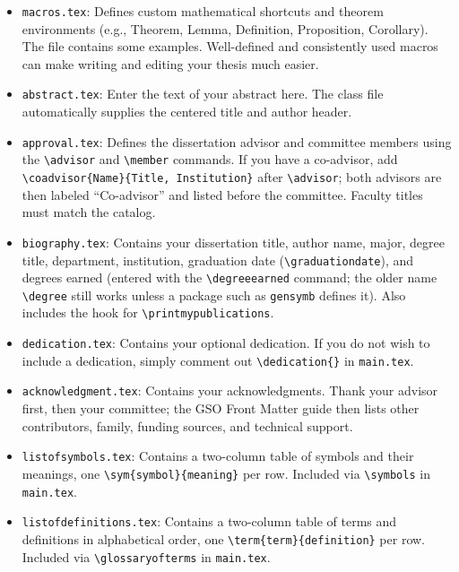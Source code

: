 \begin{itemize}
  \item \texttt{macros.tex}: Defines custom mathematical shortcuts and theorem environments (e.g., Theorem, Lemma, Definition, Proposition, Corollary). The file contains some examples. Well-defined and consistently used macros can make writing and editing your thesis much easier.

  \item \texttt{abstract.tex}: Enter the text of your abstract here. The class file automatically supplies the centered title and author header.

  \item \texttt{approval.tex}: Defines the dissertation advisor and committee members using the \verb+\advisor+ and \verb+\member+ commands. If you have a co-advisor, add \verb+\coadvisor{Name}{Title, Institution}+ after \verb+\advisor+; both advisors are then labeled ``Co-advisor'' and listed before the committee. Faculty titles must match the catalog.

  \item \texttt{biography.tex}: Contains your dissertation title, author name, major, degree title, department, institution, graduation date (\verb+\graduationdate+), and degrees earned (entered with the \verb+\degreeearned+ command; the older name \verb+\degree+ still works unless a package such as \texttt{gensymb} defines it). Also includes the hook for \verb+\printmypublications+.

  \item \texttt{dedication.tex}: Contains your optional dedication. If you do not wish to include a dedication, simply comment out \verb+\dedication{}+ in \texttt{main.tex}.

  \item \texttt{acknowledgment.tex}: Contains your acknowledgments. Thank your advisor first, then your committee; the GSO Front Matter guide then lists other contributors, family, funding sources, and technical support.

  \item \texttt{listofsymbols.tex}: Contains a two-column table of symbols and their meanings, one \verb+\sym{symbol}{meaning}+ per row. Included via \verb+\symbols+ in \texttt{main.tex}.

  \item \texttt{listofdefinitions.tex}: Contains a two-column table of terms and definitions in alphabetical order, one \verb+\term{term}{definition}+ per row. Included via \verb+\glossaryofterms+ in \texttt{main.tex}.



\end{itemize}
